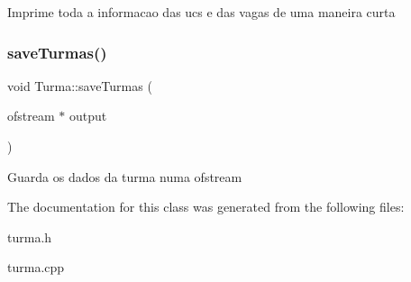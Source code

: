 Imprime toda a informacao das ucs e das vagas de uma maneira curta \hypertarget{class_turma_a651127027bbf5ef0c86585fc4569f7da}{}\label{class_turma_a651127027bbf5ef0c86585fc4569f7da} 
\subsubsection{\texorpdfstring{save\+Turmas()}{saveTurmas()}}
{\footnotesize\ttfamily void Turma\+::save\+Turmas (\begin{DoxyParamCaption}\item[{ofstream $\ast$}]{output }\end{DoxyParamCaption})}

Guarda os dados da turma numa ofstream 

The documentation for this class was generated from the following files\+:\begin{DoxyCompactItemize}
\item 
turma.\+h\item 
turma.\+cpp\end{DoxyCompactItemize}
